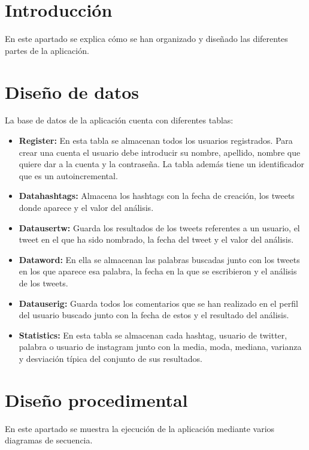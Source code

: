 
\section{Introducción}
En este apartado se explica cómo se han organizado y diseñado las diferentes partes de la aplicación.

\section{Diseño de datos}
La base de datos de la aplicación cuenta con diferentes tablas:

\begin{itemize}\tightlist
    \item \textbf{Register:} En esta tabla se almacenan todos los usuarios registrados. Para crear una cuenta el usuario debe introducir su nombre, apellido, nombre que quiere dar a la cuenta y la contraseña. La tabla además tiene un identificador que es un autoincremental.
    \item \textbf{Datahashtags:} Almacena los hashtags con la fecha de creación, los tweets donde aparece y el valor del análisis. 
    \item \textbf{Datausertw:} Guarda los resultados de los tweets referentes a un usuario, el tweet en el que ha sido nombrado, la fecha del tweet y el valor del análisis.
    \item \textbf{Dataword:} En ella se almacenan las palabras buscadas junto con los tweets en los que aparece esa palabra, la fecha en la que se escribieron y el análisis de los tweets.
    \item \textbf{Datauserig:} Guarda todos los comentarios que se han realizado en el perfil del usuario buscado junto con la fecha de estos y el resultado del análisis.
    \item \textbf{Statistics:} En esta tabla se almacenan cada hashtag, usuario de twitter, palabra o usuario de instagram junto con la media, moda, mediana, varianza y desviación típica del conjunto de sus resultados.
\end{itemize}


\newpage
\section{Diseño procedimental}
En este apartado se muestra la ejecución de la aplicación mediante varios diagramas de secuencia.

